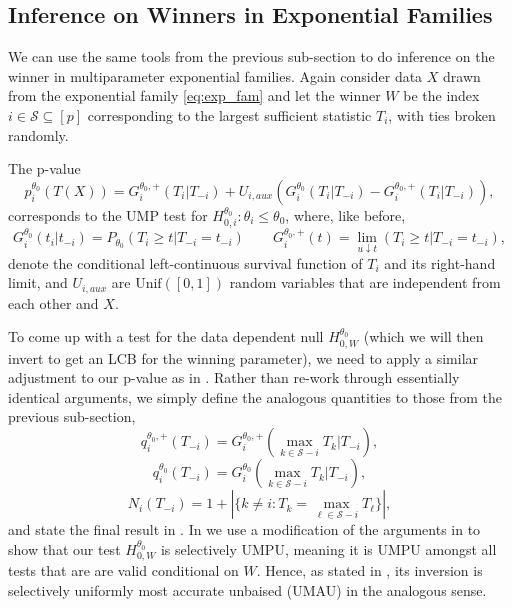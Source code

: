 \documentclass{article}
\begin{document}
\begin{appendix}
\subsection{Inference on Winners in Exponential Families}

We can use the same tools from the previous sub-section  to do inference on the winner in multiparameter exponential families. Again consider data $X$ drawn from the exponential family \eqref{eq:exp_fam} and let the winner $W$ be the index $i \in \mathcal{S} \subseteq [p]$ corresponding to the largest sufficient statistic $T_i$, with ties broken randomly.

The p-value 
\begin{equation}
    \label{eq:ump_exp_fam}
    p_i^{\theta_0}(T(X)) = G^{\theta_0, +}_i(T_i|T_{-i}) + U_{i, aux}(G^{\theta_0}_i(T_i|T_{-i}) - G^{\theta_0, +}_i(T_i|T_{-i})),
\end{equation}
corresponds to the UMP test for $H_{0, i}^{\theta_0}: \theta_i \leq \theta_0$, where, like before,
\begin{equation*}
    G^{\theta_0}_i(t_i | t_{-i}) = P_{\theta_0}(T_i \geq t | T_{-i} = t_{-i}) \qquad G^{\theta_0, +}_i(t) = \lim_{u \downarrow t}(T_i \geq t | T_{-i} = t_{-i} ),
\end{equation*}
denote the conditional left-continuous survival function of $T_i$ and its right-hand limit, and $U_{i, aux}$ are $\text{Unif}([0,1])$ random variables that are independent from each other and $X$.

To come up with a test for the data dependent null $H_{0, W}^{\theta_0}$ (which we will then invert to get an LCB for the winning parameter), we need to apply a similar adjustment to our p-value as in . Rather than re-work through essentially identical arguments, we simply define the analogous quantities to those from the previous sub-section,
\begin{equation}
    \label{eq:exp_fam_lower}
    q^{\theta_0, +}_i(T_{-i}) = G^{\theta_0, +}_i(\max_{k \in \mathcal{S} - i } T_k | T_{-i}), 
\end{equation} 
\begin{equation}
    \label{eq:exp_fam_upper}
    q^{\theta_0}_i(T_{-i}) = G^{\theta_0}_i(\max_{k \in \mathcal{S} - i } T_k | T_{-i}),
\end{equation} 
\begin{equation}
    \label{eq:exp_fam_num_ties}
    N_i(T_{-i}) = 1 + | \{k \neq i: T_k = \max_{\ell \in \mathcal{S} - i} T_\ell \}|,
\end{equation}
and state the final result in . In  we use a modification of the arguments in \cite{Fithian2017} to show that our test $H^{\theta_0}_{0, W}$ is selectively UMPU, meaning it is UMPU amongst all tests that are are valid conditional on $W$. Hence, as stated in , its inversion is selectively uniformly most accurate unbaised (UMAU) in the analogous sense. 


\end{appendix}
\end{document}
